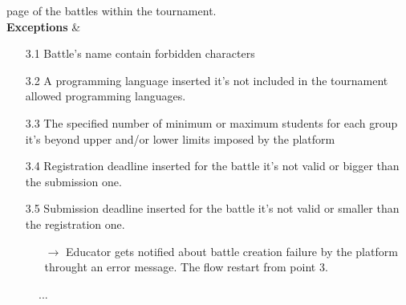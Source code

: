 \documentclass{article}
\begin{document}
{\begin{enumerate}
\begin{xltabular}{\textwidth}
                         page of the battles within the tournament.
                         \\
                        \hline
                        \textbf{Exceptions} &    \begin{itemize}
                                                    \item[3.1] Battle's name contain forbidden characters
                                                    \item[3.2] A programming language inserted it's not included in the tournament
                                                    allowed programming languages.
                                                    \item[3.3] The specified number of minimum or maximum students for each group
                                                    it's beyond upper and/or lower limits imposed by the platform
                                                    \item[3.4] Registration deadline inserted for the battle it's not valid or
                                                    bigger than the submission one.
                                                    \item[3.5] Submission deadline inserted for the battle it's not valid or 
                                                    smaller than the registration one.
                                                    \begin{itemize}
                                                        \item[$\rightarrow$] Educator gets notified about battle creation failure
                                                        by the platform throught an error message. The flow restart from point 3.
                                                    \end{itemize} 
                                                \end{itemize}
                    \end{xltabular}
                    
                    \begin{figure}[H]
                        \centering
                        \caption{...}
                        \label{fig:BattleCreationSeqDiagram}
                    \end{figure}


\end{enumerate}}
\end{document}
